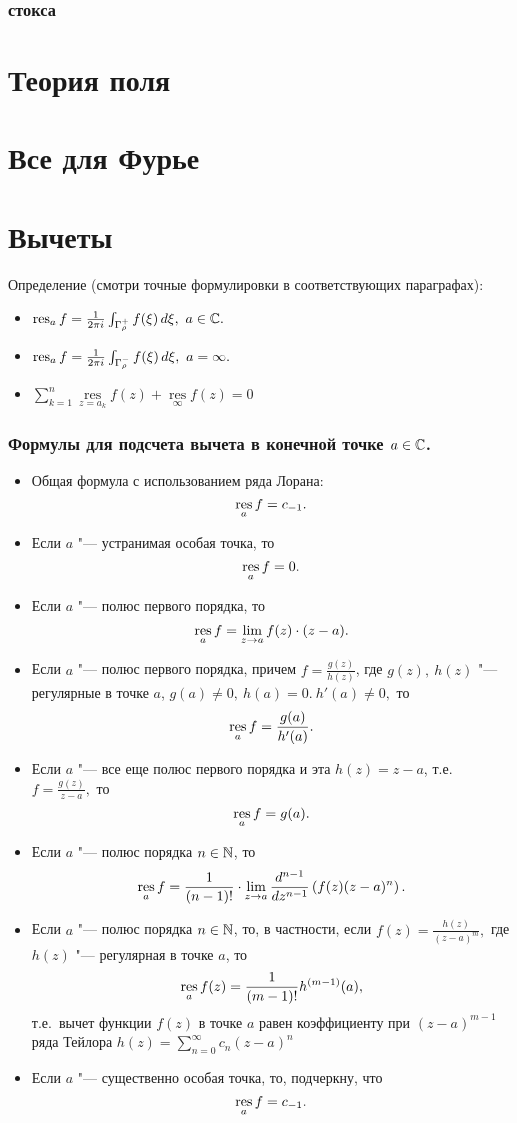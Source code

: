\subsubsection{стокса}

\section{Теория поля}

\section{Все для Фурье}


\section{Вычеты}
\noindent Определение (смотри точные формулировки в соответствующих параграфах):
\begin{itemize}
\item
$\operatorname*{res}_a f=\frac{1}{2\pi i} \int_{\Gamma_{\rho}^{+}} f(\xi)\, d\xi,\ a\in\mathbb{C}.$
\item
$\operatorname*{res}_a f=\frac{1}{2\pi i} \int_{\Gamma_{\rho}^{-}} f(\xi)\, d\xi,\ a=\infty.$
\item
$\sum _{k=1}^{n}\mathop {\mathrm {res} } \limits _{z=a_{k}}f(z) + \mathop {\mathrm {res}} \limits _{\infty } f(z) = 0 $
\end{itemize}

\subsubsection{Формулы для подсчета вычета в конечной точке $a \in \mathbb{C}$.}
\begin{itemize}
\item
Общая формула с использованием ряда Лорана:
$$\operatorname*{res}_a f = c_{-1}.$$
\item
Если $a$ "--- устранимая особая точка, то
$$\operatorname*{res}_a f=0.$$
\item 
Если $a$ "--- полюс первого порядка, то
$$\operatorname*{res}_a f=\lim_{z\to a}{f(z)\cdot(z-a)}.$$
\item
Если $a$ "--- полюс первого порядка, причем $f=\frac{g(z)}{h(z)}$, где $g(z),\ h(z)$ "--- регулярные в точке $a$, $g(a)\neq 0,\ h(a)=0. \ h'(a)\neq 0,$ то 
$$\operatorname*{res}_a f=\frac{g(a)}{h'(a)}.$$
\item
Если $a$ "--- все еще полюс первого порядка и эта $h(z)=z-a$, т.е. $f=\frac{g(z)}{z-a},$ то
$$\operatorname*{res}_a f=g(a).$$
\item
Если $a$ "--- полюс порядка $n\in\mathbb{N}$, то
$$
\operatorname*{res}_a f = \frac{1}{(n-1)!}\cdot \lim\limits_{z\to a} \frac{d^{n-1}}{dz^{n-1}}\left(f(z)(z-a)^n\right).
$$
\item
Если $a$ "--- полюс порядка $n\in\mathbb{N}$, то, в частности, если $f(z)=\frac{h(z)}{(z-a)^m},$ где $h(z)$ "--- регулярная в точке $a$, то 
$$\operatorname*{res}_a f(z) = \frac{1}{(m-1)!} h^{(m-1)}(a),$$
т.е.~вычет функции $f(z)$ в точке $a$ равен коэффициенту при $(z-a)^{m-1}$ ряда Тейлора $h(z)=\sum\limits_{n=0}^{\infty} c_n (z-a)^n$

\item
Если  $a$ "--- существенно особая точка, то, подчеркну, что 
$$\operatorname*{res}_a f = c_{-1}.$$
\end{itemize}

